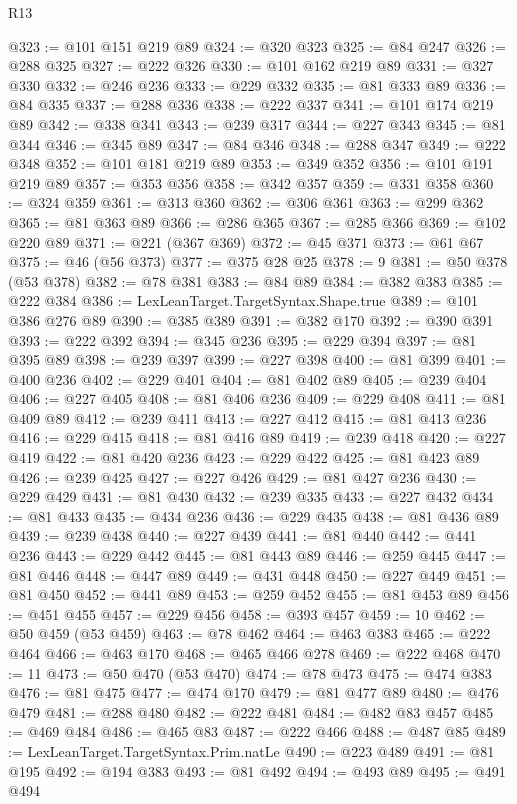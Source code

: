 \begin{lexlean}{R13}
\begin{coremodule}
@323 := @101 @151 @219 @89
@324 := @320 @323
@325 := @84 @247
@326 := @288 @325
@327 := @222 @326
@330 := @101 @162 @219 @89
@331 := @327 @330
@332 := @246 @236
@333 := @229 @332
@335 := @81 @333 @89
@336 := @84 @335
@337 := @288 @336
@338 := @222 @337
@341 := @101 @174 @219 @89
@342 := @338 @341
@343 := @239 @317
@344 := @227 @343
@345 := @81 @344
@346 := @345 @89
@347 := @84 @346
@348 := @288 @347
@349 := @222 @348
@352 := @101 @181 @219 @89
@353 := @349 @352
@356 := @101 @191 @219 @89
@357 := @353 @356
@358 := @342 @357
@359 := @331 @358
@360 := @324 @359
@361 := @313 @360
@362 := @306 @361
@363 := @299 @362
@365 := @81 @363 @89
@366 := @286 @365
@367 := @285 @366
@369 := @102 @220 @89
@371 := @221 (@367 @369)
@372 := @45 @371
@373 := @61 @67
@375 := @46 (@56 @373)
@377 := @375 @28 @25
@378 := 9
@381 := @50 @378 (@53 @378)
@382 := @78 @381
@383 := @84 @89
@384 := @382 @383
@385 := @222 @384
@386 := LexLeanTarget.TargetSyntax.Shape.true
@389 := @101 @386 @276 @89
@390 := @385 @389
@391 := @382 @170
@392 := @390 @391
@393 := @222 @392
@394 := @345 @236
@395 := @229 @394
@397 := @81 @395 @89
@398 := @239 @397
@399 := @227 @398
@400 := @81 @399
@401 := @400 @236
@402 := @229 @401
@404 := @81 @402 @89
@405 := @239 @404
@406 := @227 @405
@408 := @81 @406 @236
@409 := @229 @408
@411 := @81 @409 @89
@412 := @239 @411
@413 := @227 @412
@415 := @81 @413 @236
@416 := @229 @415
@418 := @81 @416 @89
@419 := @239 @418
@420 := @227 @419
@422 := @81 @420 @236
@423 := @229 @422
@425 := @81 @423 @89
@426 := @239 @425
@427 := @227 @426
@429 := @81 @427 @236
@430 := @229 @429
@431 := @81 @430
@432 := @239 @335
@433 := @227 @432
@434 := @81 @433
@435 := @434 @236
@436 := @229 @435
@438 := @81 @436 @89
@439 := @239 @438
@440 := @227 @439
@441 := @81 @440
@442 := @441 @236
@443 := @229 @442
@445 := @81 @443 @89
@446 := @259 @445
@447 := @81 @446
@448 := @447 @89
@449 := @431 @448
@450 := @227 @449
@451 := @81 @450
@452 := @441 @89
@453 := @259 @452
@455 := @81 @453 @89
@456 := @451 @455
@457 := @229 @456
@458 := @393 @457
@459 := 10
@462 := @50 @459 (@53 @459)
@463 := @78 @462
@464 := @463 @383
@465 := @222 @464
@466 := @463 @170
@468 := @465 @466 @278
@469 := @222 @468
@470 := 11
@473 := @50 @470 (@53 @470)
@474 := @78 @473
@475 := @474 @383
@476 := @81 @475
@477 := @474 @170
@479 := @81 @477 @89
@480 := @476 @479
@481 := @288 @480
@482 := @222 @481
@484 := @482 @83 @457
@485 := @469 @484
@486 := @465 @83
@487 := @222 @466
@488 := @487 @85
@489 := LexLeanTarget.TargetSyntax.Prim.natLe
@490 := @223 @489
@491 := @81 @195
@492 := @194 @383
@493 := @81 @492
@494 := @493 @89
@495 := @491 @494

\end{coremodule}
\end{lexlean}

